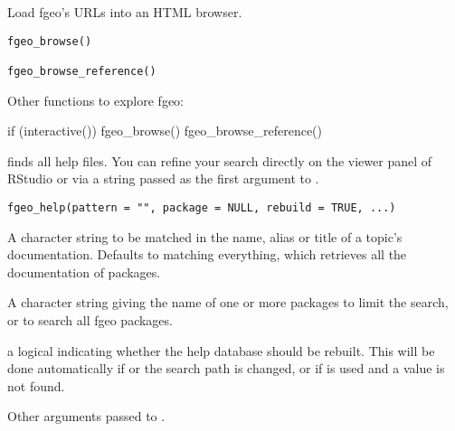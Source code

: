 \documentclass[a4paper]{book}
\begin{document}
%
\begin{Description}\relax
Load fgeo's URLs into an HTML browser.
\end{Description}
%
\begin{Usage}
\begin{verbatim}
fgeo_browse()

fgeo_browse_reference()
\end{verbatim}
\end{Usage}
%
\begin{SeeAlso}\relax
Other functions to explore fgeo: 
\end{SeeAlso}
%
\begin{Examples}
\begin{ExampleCode}
if (interactive()) {
  fgeo_browse()
  fgeo_browse_reference()
}
\end{ExampleCode}
\end{Examples}
%
\begin{Description}\relax
{} finds all  help files. You can refine
your search directly on the viewer panel of RStudio or via a string passed
as the first argument to .
\end{Description}
%
\begin{Usage}
\begin{verbatim}
fgeo_help(pattern = "", package = NULL, rebuild = TRUE, ...)
\end{verbatim}
\end{Usage}
%
\begin{Arguments}
\begin{ldescription}
\item[\code{pattern}] A character string to be matched in the name, alias or title
of a topic's documentation. Defaults to matching everything, which
retrieves all the documentation of  packages.

\item[\code{package}] A character string giving the name of one or more
packages to limit the search, or  to search all fgeo packages.

\item[\code{rebuild}] a logical indicating whether the help database should
be rebuilt.  This will be done automatically if  or
the search path is changed, or if  is used and a value
is not found.

\item[\code{...}] Other arguments passed to .
\end{ldescription}
\end{Arguments}
\end{document}
